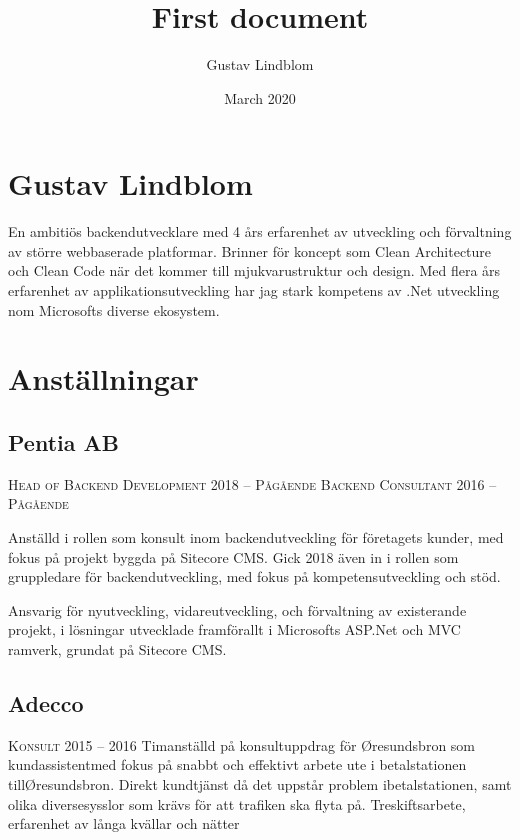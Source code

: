 \documentclass[usenames,dvipsnames]{article}
\title{First document}
\author{Gustav Lindblom}
\date{March 2020}
\begin{document}
\hspace{-1.6cm}\begin{minipage}[t]{0.65\textwidth}

\section*{\textcolor{NavyBlue}{Gustav Lindblom}}
\begin{flushleft}
En ambitiös backendutvecklare med 4 års erfarenhet av utveckling och förvaltning av större webbaserade platformar. Brinner för koncept som Clean Architecture och Clean Code när det kommer till mjukvarustruktur och design. Med flera års erfarenhet av applikationsutveckling har jag stark kompetens av .Net utveckling nom Microsofts diverse ekosystem.
\end{flushleft}

\section*{\textcolor{NavyBlue}{Anställningar}}
\subsection*{\textcolor{NavyBlue}{Pentia AB}}
\begin{flushleft}
\textsc{Head of Backend Development 2018 -- Pågående}\break
\textsc{Backend Consultant 2016 -- Pågående}\break 
\par Anställd i rollen som konsult inom backendutveckling för företagets kunder, med fokus på projekt byggda på Sitecore CMS. Gick 2018 även in i rollen som gruppledare för backendutveckling, med fokus på kompetensutveckling och stöd.
\par Ansvarig för nyutveckling, vidareutveckling, och förvaltning av existerande projekt, i lösningar utvecklade framförallt i Microsofts ASP.Net och MVC ramverk, grundat på Sitecore CMS.
\end{flushleft}

\subsection*{\textcolor{NavyBlue}{Adecco}}
\begin{flushleft}
\textsc{Konsult 2015 -- 2016}\break
Timanställd på konsultuppdrag för Øresundsbron som kundassistentmed fokus på snabbt och effektivt arbete ute i betalstationen tillØresundsbron. Direkt kundtjänst då det uppstår problem ibetalstationen, samt olika diversesysslor som krävs för att trafiken ska
flyta på. Treskiftsarbete, erfarenhet av långa kvällar och nätter
\end{flushleft}


\end{minipage}
\end{document}
